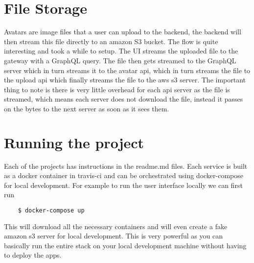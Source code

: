 \section{File Storage}

Avatars are image files that a user can upload to the backend, the backend will then stream this file directly to an amazon S3 bucket. The flow is quite interesting and took a while to setup. The UI streams the uploaded file to the gateway with a GraphQL query. The file then gets streamed to the GraphQL server which in turn streams it to the avatar api, which in turn streams the file to the upload api which finally streams the file to the aws  s3 server. The important thing to note is there is very little overhead for each api server as the file is streamed, which means each server does not download the file, instead it passes on the bytes to the next server as soon as it sees them. 

\section{Running the project}

Each of the projects has instructions in the readme.md files. Each service is built as a docker container in travis-ci and can be orchestrated using docker-compose for local development. For example to run the user interface locally we can first run 

\begin{verbatim}
	$ docker-compose up
\end{verbatim}
This will download all the necessary containers and will even create a fake amazon s3 server for local development. This is very powerful as you can basically run the entire stack on your local development machine without having to deploy the apps. 